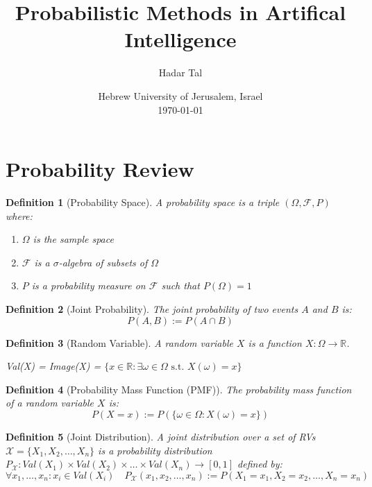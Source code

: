 \documentclass[11pt]{article}
\title{
    \huge Probabilistic Methods in Artifical Intelligence\\
    \vspace{10pt}
}
\author{Hadar Tal}
\date{Hebrew University of Jerusalem, Israel\\
    \vspace{10pt}
    \today}
\numberwithin{equation}{section}
\theoremstyle{boldStyle}
\theoremstyle{boldBlueStyle}
\theoremstyle{boldPurpleStyle}
\theoremstyle{boldRedStyle}
\newtheorem{definition}{Definition}[section]
\begin{document}
\maketitle
\tableofcontents

\newpage
\section{Probability Review}

\begin{definition}[Probability Space]
    A probability space is a triple $(\Omega, \mathcal{F}, P)$ where:
    \begin{enumerate}
        \item $\Omega$ is the sample space
        \item $\mathcal{F}$ is a $\sigma$-algebra of subsets of $\Omega$
        \item $P$ is a probability measure on $\mathcal{F}$ such that $P(\Omega) = 1$
    \end{enumerate}
\end{definition}

\begin{definition}[Joint Probability]
    The joint probability of two events $A$ and $B$ is:
    \begin{equation*}
        P(A, B) := P(A \cap B) 
    \end{equation*}
\end{definition}

\begin{definition}[Random Variable]
    A random variable $X$ is a function $X: \Omega \rightarrow \mathbb{R}$. 

    Val(X) = Image(X) = $\{ x \in \mathbb{R} : \exists \omega \in \Omega \text{ s.t. } X(\omega) = x \}$
\end{definition}

\begin{definition}[Probability Mass Function (PMF)]
    The probability mass function of a random variable $X$ is:
    \begin{equation*}
        P(X = x) := P(\{ \omega \in \Omega : X(\omega) = x \})
    \end{equation*}
\end{definition}

\begin{definition}[Joint Distribution]
    A joint distribution over a set of RVs $\mathcal{X} = \{ X_1, X_2, \ldots, X_n \}$ is a probability distribution 
    $P_{\mathcal{X}}: Val(X_1) \times Val(X_2) \times \ldots \times Val(X_n) \rightarrow [0, 1]$ defined by:
    \begin{equation*}
       \forall x_1, \ldots, x_n : x_i \in Val(X_i) \quad
        P_{\mathcal{X}}(x_1, x_2, \ldots, x_n) := P(X_1 = x_1, X_2 = x_2, \ldots, X_n = x_n)
    \end{equation*}
\end{definition}
\end{document}
